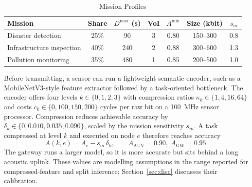 \documentclass[lettersize,journal]{IEEEtran}
\newcommand{\Dmax}{D^{\max}}
\newcommand{\Amin}{A^{\min}}
\begin{document}
\begin{table}[!t]
\centering
\caption{Mission Profiles}
\label{tab:missions}
\setlength{\tabcolsep}{3.5pt}
\begin{tabular}{@{}lcccccc@{}}
\toprule
Mission & Share & $\Dmax$ (s) & VoI & $\Amin$ & Size (kbit) & $s_m$\\
\midrule
Disaster detection & 25\% & 90 & 3 & 0.80 & 150--300 & 0.8\\
Infrastructure inspection & 40\% & 240 & 2 & 0.88 & 300--600 & 1.3\\
Pollution monitoring & 35\% & 480 & 1 & 0.85 & 200--500 & 1.0\\
\bottomrule
\end{tabular}
\end{table}

Before transmitting, a sensor can run a lightweight semantic encoder, such as a MobileNetV3-style feature extractor followed by a task-oriented bottleneck. The encoder offers four levels $k\in\{0,1,2,3\}$ with compression ratios $\kappa_k\in\{1,4,16,64\}$ and costs $c_k\in\{0,100,150,200\}$ cycles per raw bit on a 100~MHz sensor processor. Compression reduces achievable accuracy by $\delta_k\in\{0,0.010,0.035,0.090\}$, scaled by the mission sensitivity $s_m$. A task compressed at level $k$ and executed on node $e$ therefore reaches accuracy
\begin{equation}
A(k,e) = A_e - s_m\,\delta_k,\qquad A_{\mathrm{AUV}} = 0.90,\; A_{\mathrm{GW}} = 0.95 .
\end{equation}
The gateway runs a larger model, so it is more accurate but sits behind a long acoustic uplink. These values are modelling assumptions in the range reported for compressed-feature and split inference; Section~\ref{sec:disc} discusses their calibration.
\end{document}
